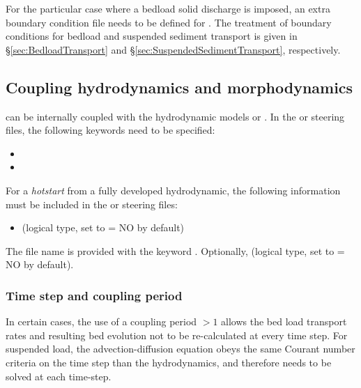 {For the particular case where a bedload solid discharge is imposed, an extra boundary condition file needs to be defined for \sisyphe{}. The treatment of boundary conditions for bedload and suspended sediment transport is given in \S\ref{sec:BedloadTransport} and \S\ref{sec:SuspendedSedimentTransport}, respectively.

\subsection{Coupling hydrodynamics and morphodynamics}
\sisyphe{} can be internally coupled with the hydrodynamic models  or . In the  or  steering files, the following keywords need to be specified:
\begin{itemize}
\item {} 
\item {} 
\end{itemize}
For a \textit{hotstart} from a fully developed hydrodynamic, the following information must be included in the  or  steering files:
\begin{itemize}
\item {} (logical type, set to {\ttfamily = NO} by default)
\end{itemize}
The file name is provided with the keyword . Optionally,  (logical type, set to {\ttfamily = NO} by default).


\subsubsection{Time step and coupling period}
In certain cases, the use of a coupling period $>1$ allows the bed load transport rates and resulting bed
evolution not to be re-calculated at every time step. For suspended load, the advection-diffusion equation obeys the same Courant number criteria on the time step than the hydrodynamics, and therefore needs to be solved at each time-step.

}
